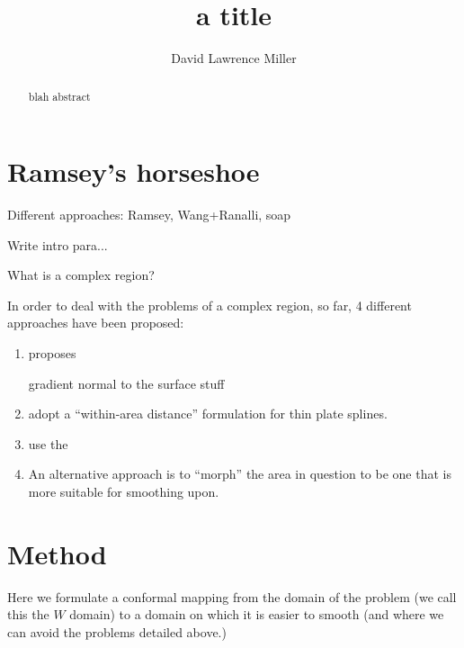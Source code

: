 \documentclass[a4paper,10pt]{amsart}
\title{a title}
\author{David Lawrence Miller}
\begin{document}
\begin{abstract}
blah abstract
\end{abstract}


\newtheorem{thm}{Theorem}[section]

\newtheorem{defn}{Definition}[section]

\maketitle



\section{Ramsey's horseshoe}

Different approaches: Ramsey, Wang+Ranalli, soap

Write intro para...

What is a complex region?



In order to deal with the problems of a complex region, so far, 4 different approaches have been proposed:

\begin{enumerate}
\item \cite{ramsay} proposes

gradient normal to the surface stuff



\item \cite{wangranalli} adopt a ``within-area distance'' formulation for thin plate splines.




\item \cite{soap} use the 

\item An alternative approach is to ``morph'' the area in question to be one that is more suitable for smoothing upon.

\end{enumerate}




\section{Method}

Here we formulate a conformal mapping from the domain of the problem (we call this the $W$ domain) to a domain on which it is easier to smooth (and where we can avoid the problems detailed above.)
\end{document}
